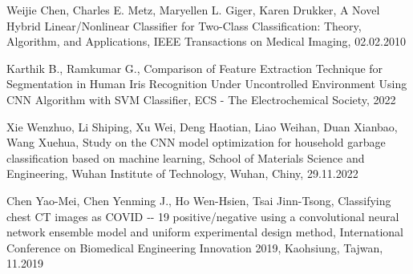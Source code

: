 \documentclass[12pt, a4paper, twoside, openany]{book}
\begin{document}
\begin{enumerate}[label={[}\arabic*{]}]
    \item Weijie Chen, Charles E. Metz, Maryellen L. Giger, Karen Drukker, A Novel Hybrid Linear/Nonlinear Classifier for Two-Class Classification: Theory, Algorithm, and Applications, IEEE Transactions on Medical Imaging, 02.02.2010
    \item Karthik B., Ramkumar G., Comparison of Feature Extraction Technique for Segmentation in Human Iris Recognition Under Uncontrolled Environment Using CNN Algorithm with SVM Classifier, ECS - The Electrochemical Society, 2022
    \item Xie Wenzhuo, Li Shiping, Xu Wei, Deng Haotian, Liao Weihan, Duan Xianbao, Wang Xuehua, Study on the CNN model optimization for household garbage classification based on machine learning, School of Materials Science and Engineering, Wuhan Institute of Technology, Wuhan, Chiny, 29.11.2022
    \item Chen Yao-Mei, Chen Yenming J., Ho Wen-Hsien, Tsai Jinn-Tsong, Classifying chest CT images as COVID ‑- 19 positive/negative using a convolutional neural network ensemble model and uniform experimental design method, International Conference on Biomedical Engineering Innovation 2019, Kaohsiung, Tajwan, 11.2019
\end{enumerate}
\end{document}
